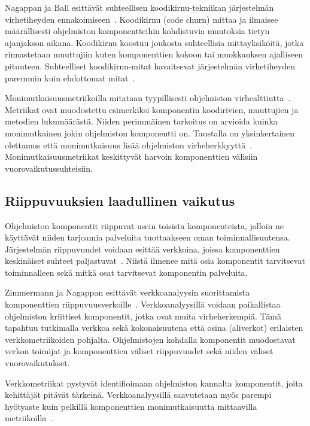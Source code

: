\documentclass[finnish]{../tktltiki2}
\theoremstyle{definition}
\theoremstyle{remark}
\begin{document}
Nagappan ja Ball esittävät suhteellisen koodikirnu-tekniikan järjestelmän virhetiheyden ennakoimiseen~\cite{NB05}. 
Koodikirnu (code churn) mittaa ja ilmaisee määrällisesti ohjelmiston komponentteihin kohdistuvia muutoksia tietyn 
ajanjakson aikana. Koodikirnu koostuu joukosta suhteellisia mittayksiköitä, jotka rinnastetaan muuttujiin 
kuten komponenttien kokoon tai muokkauksen ajalliseen pituuteen. Suhteelliset koodikirnu-mitat havaitsevat järjestelmän 
virhetiheyden paremmin kuin ehdottomat mitat~\cite{NB05}.

    Monimutkaisuusmetriikoilla mitataan tyypillisesti ohjelmiston virhealttiutta~\cite{ZN08}. Metriikat ovat muodostettu 
esimerkiksi komponentin koodirivien, muuttujien ja metodien lukumäärästä. Niiden perimmäinen tarkoitus on arvioida 
kuinka monimutkainen jokin ohjelmiston komponentti on. Taustalla on yksinkertainen olettamus että monimutkaisuus lisää 
ohjelmiston virheherkkyyttä~\cite{CK94, BBM96, NB05, NB07, ZN08, MNDT09}. Monimutkaisuusmetriikat keskittyvät harvoin 
komponenttien välisiin vuorovaikutussuhteisiin.

\subsection{Riippuvuuksien laadullinen vaikutus}

    Ohjelmiston komponentit riippuvat usein toisista komponenteista, jolloin ne käyttävät niiden tarjoamia palveluita 
tuottaakseen oman toiminnallisuutensa. Järjestelmän riippuvuudet voidaan esittää verkkoina, joissa komponenttien 
keskinäiset suhteet paljastuvat~\cite{ZN08}. Niistä ilmenee mitä osia komponentit tarvitsevat toiminnalleen sekä mitkä 
osat tarvitsevat komponentin palveluita.

    Zimmermann ja Nagappan esittävät verkkoanalyysin suorittamista komponenttien riippuvuusverkoille~\cite{ZN08}. 
Verkkoanalyysillä voidaan paikallistaa ohjelmiston kriittiset komponentit, jotka ovat muita virheherkempiä. Tämä 
tapahtuu tutkimalla verkkoa sekä kokonaisuutena että osina (aliverkot) erilaisten verkkometriikoiden pohjalta. 
Ohjelmistojen kohdalla komponentit muodostavat verkon toimijat ja komponenttien väliset riippuvuudet sekä niiden väliset 
vuorovaikutukset.

    Verkkometriikat pystyvät identifioimaan ohjelmiston kannalta komponentit, joita kehittäjät pitävät tärkeinä. 
Verkkoanalyysillä saavutetaan myös parempi hyötyaste kuin pelkillä komponenttien monimutkaisuutta mittaavilla 
metriikoilla~\cite{ZN08}.
\end{document}
